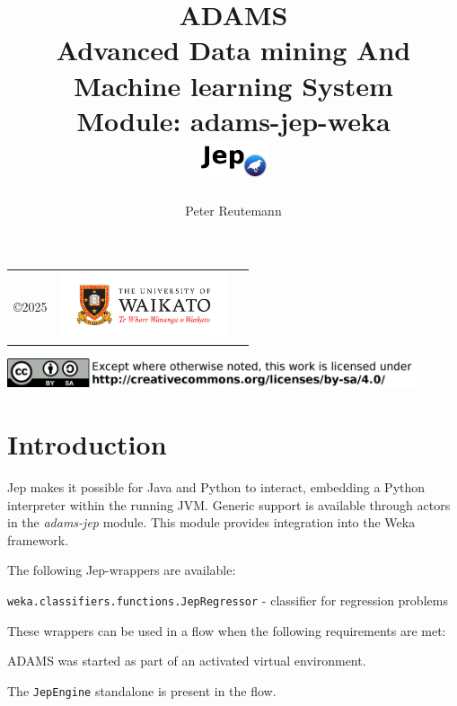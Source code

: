 \documentclass[a4paper]{book}
\title{
  \textbf{ADAMS} \\
  {\Large \textbf{A}dvanced \textbf{D}ata mining \textbf{A}nd \textbf{M}achine
  learning \textbf{S}ystem} \\
  {\Large Module: adams-jep-weka} \\
  \vspace{1cm}
  \includegraphics[width=2cm]{images/jep-weka-module.png} \\
}
\author{
  Peter Reutemann
}
\begin{document}
\begin{titlepage}
\maketitle

\thispagestyle{empty}
\center
\begin{table}[b]
	\begin{tabular}{c l l}
		\parbox[c][2cm]{2cm}{\copyright 2025} &
		\parbox[c][2cm]{5cm}{\includegraphics[width=5cm]{images/coat_of_arms.pdf}} \\
	\end{tabular}
	\includegraphics[width=12cm]{images/cc.png} \\
\end{table}

\end{titlepage}

\tableofcontents


\chapter{Introduction}
Jep\cite{jep} makes it possible for Java and Python to interact, embedding a Python
interpreter within the running JVM. Generic support is available through actors
in the \textit{adams-jep} module. This module provides integration into the Weka
framework.

\noindent The following Jep-wrappers are available:
\begin{tight_itemize}
    \item \texttt{weka.classifiers.functions.JepRegressor} - classifier for regression problems
\end{tight_itemize}

\noindent These wrappers can be used in a flow when the following requirements are met:
\begin{tight_itemize}
    \item ADAMS was started as part of an activated virtual environment.
    \item The \texttt{JepEngine} standalone is present in the flow.
\end{tight_itemize}



\end{document}
